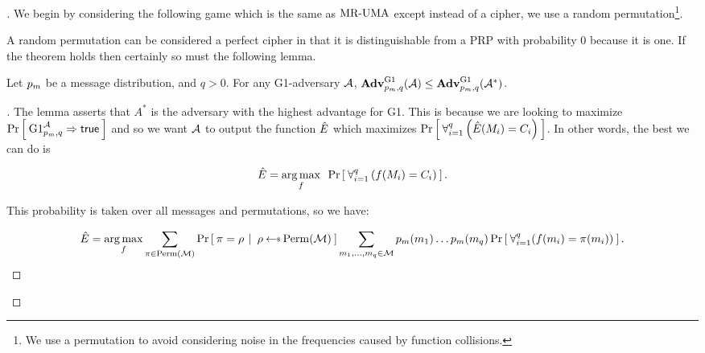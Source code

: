  \begin{proof}[]We begin by considering the following game which is the same as $\textnormal{MR-UMA}$ except instead of a cipher, we use a random permutation\footnote{We use a permutation to avoid considering noise in the frequencies caused by function collisions.}.

\begin{figure}[H]
\centering
{}
\end{figure}


A random permutation can be considered a perfect cipher in that it is distinguishable from a PRP with probability 0 because it is one. If the theorem holds then certainly so must the following lemma.

\begin{lemma}
\label{freqsidelem}
Let $p_m$ be a message distribution, and $q>0$. For any G1-adversary ${\mathcal A}$, $\mathbf{Adv}^{\textrm{G1}}_{p_m,q}({\mathcal A})\leq\mathbf{Adv}^{\textrm{G1}}_{p_m,q}({\mathcal A}^*)$.
\end{lemma}

\begin{proof}[]

The lemma asserts that $A^*$ is the adversary with the highest advantage for G1.  This is because we are looking to maximize 
$\Pr\left[\: \textrm{G1}^{\mathcal A}_{p_m,q}\Rightarrow\mathsf{true} \:\right]$
and so we want ${\mathcal A}$ to output the function $\hat{E}$ which maximizes $\Pr\left[\: \forall_{i=1}^q \left(\hat{E}(M_i) = C_i\right) \:\right]$. In other words, the best we can do is 

$$\hat{E}=\operatorname*{arg\,max}_f \textrm{ } \Pr\left[\: \forall_{i=1}^q \left(f(M_i) = C_i\right) \:\right].$$

This probability is taken over all messages and permutations, so we have:

$$\hatE= \argmax_f \sum_{\pi\in\Perm(\msgspace)}\CondProb{\pi=\rho}{\rho\getsr\Perm(\msgspace)} \sum_{m_1, \ldots,m_q\in \msgspace} \mdist(m_1)\ldots\mdist(m_q)\Prob{\forall_{i=1}^q (f(m_i)=\pi(m_i))}.$$


\end{proof}
\end{proof}
